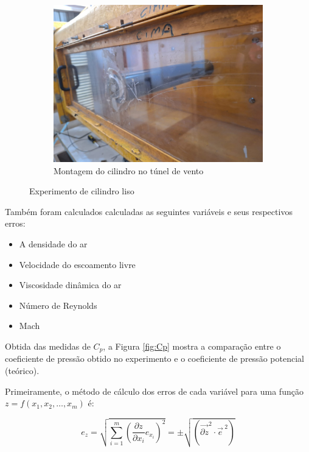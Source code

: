 \begin{figure}[htbp]
\begin{subfigure}{0.55\textwidth}
        \includegraphics[width=\textwidth]{01.Parte1/Figuras/Cilindro - representação - vista em perspectiva.jpg}
        \caption{Montagem do cilindro no túnel de vento}
        \label{fig:Monta}
    \end{subfigure}
    
    \caption{Experimento de cilindro liso}
    \label{fig:dos_imagenes}
\end{figure}

Também foram calculados calculadas as seguintes variáveis e seus respectivos erros:
\begin{itemize}
    \item A densidade do ar
    \item Velocidade do escoamento livre
    \item Viscosidade dinâmica do ar
    \item Número de Reynolds
    \item Mach
\end{itemize}

Obtida das medidas de $C_p$, a Figura \ref{fig:Cp} mostra a comparação entre o coeficiente de pressão obtido no experimento e o coeficiente de pressão potencial (teórico).

Primeiramente, o método de cálculo dos erros de cada variável para uma função $z = f(x_{1}, x_{2}, \dots , x_{m})$ é:

\begin{equation}
   e_z =\sqrt{\sum_{i=1}^{m}\left ( \frac{\partial z}{\partial x_{i}} e_{x_{i}} \right )^{2} }  = \pm  \sqrt{\left ( \vec{\partial z}^{2}\cdot {\vec{e}}^{\ 2} \right )} 
\end{equation}

